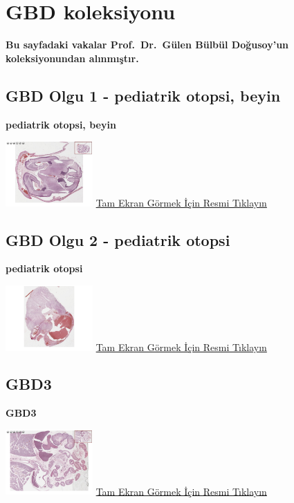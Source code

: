 \documentclass[
  letterpaper,
  DIV=11,
  numbers=noendperiod]{scrreprt}
\begin{document}
\hypertarget{gbd-koleksiyonu}{%
\chapter{GBD koleksiyonu}\label{gbd-koleksiyonu}}

\textbf{Bu sayfadaki vakalar Prof.~Dr.~Gülen Bülbül Doğusoy'un
koleksiyonundan alınmıştır.}

\hypertarget{sec-GBD1}{%
\section{GBD Olgu 1 - pediatrik otopsi, beyin}\label{sec-GBD1}}

\textbf{pediatrik otopsi, beyin}

\href{https://images.patolojiatlasi.com/GBD1/HE.html}{\includegraphics[width=0.25\textwidth,height=\textheight]{./screenshots/thumbnail_GBD1.png}}
\href{https://images.patolojiatlasi.com/GBD1/HE.html}{Tam Ekran Görmek
İçin Resmi Tıklayın}

\hypertarget{sec-GBD2}{%
\section{GBD Olgu 2 - pediatrik otopsi}\label{sec-GBD2}}

\textbf{pediatrik otopsi}

\href{https://images.patolojiatlasi.com/GBD2/HE.html}{\includegraphics[width=0.25\textwidth,height=\textheight]{./screenshots/thumbnail_GBD2.png}}
\href{https://images.patolojiatlasi.com/GBD2/HE.html}{Tam Ekran Görmek
İçin Resmi Tıklayın}

\hypertarget{sec-GBD3}{%
\section{GBD3}\label{sec-GBD3}}

\textbf{GBD3}

\href{https://images.patolojiatlasi.com/GBD3/HE.html}{\includegraphics[width=0.25\textwidth,height=\textheight]{./screenshots/thumbnail_GBD3.png}}
\href{https://images.patolojiatlasi.com/GBD3/HE.html}{Tam Ekran Görmek
İçin Resmi Tıklayın}
\end{document}
